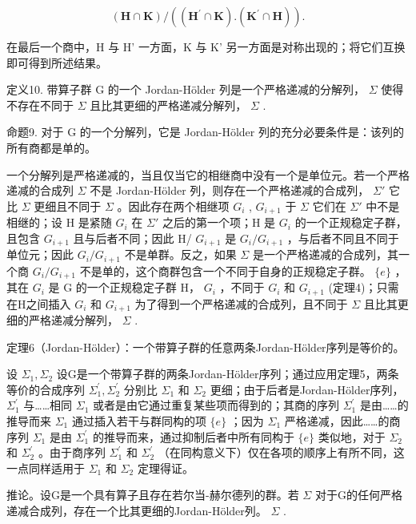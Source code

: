 \[
(\mathbf {H} \cap \mathbf {K}) / ((\mathbf {H} ^ {\prime} \cap \mathbf {K}). (\mathbf {K} ^ {\prime} \cap \mathbf {H})).
\]

在最后一个商中，H 与 H' 一方面，K 与 K' 另一方面是对称出现的；将它们互换即可得到所述结果。

定义10. 带算子群 G 的一个 Jordan-Hölder 列是一个严格递减的分解列， \(\Sigma\) 使得不存在不同于 \(\Sigma\) 且比其更细的严格递减分解列， \(\Sigma\) .

命题9. 对于 G 的一个分解列，它是 Jordan-Hölder 列的充分必要条件是：该列的所有商都是单的。

一个分解列是严格递减的，当且仅当它的相继商中没有一个是单位元。若一个严格递减的合成列 \(\Sigma\) 不是 Jordan-Hölder 列，则存在一个严格递减的合成列， \(\Sigma'\) 它比 \(\Sigma\) 更细且不同于 \(\Sigma\) 。因此存在两个相继项 \(G_i\) , \(G_{i+1}\) 于 \(\Sigma\) 它们在 \(\Sigma'\) 中不是相继的；设 H 是紧随 \(G_i\) 在 \(\Sigma'\) 之后的第一个项；H 是 \(G_i\) 的一个正规稳定子群，且包含 \(G_{i+1}\) 且与后者不同；因此 H/ \(G_{i+1}\) 是 \(G_i/G_{i+1}\) ，与后者不同且不同于单位元；因此 \(G_i/G_{i+1}\) 不是单群。反之，如果 \(\Sigma\) 是一个严格递减的合成列，其一个商 \(G_i/G_{i+1}\) 不是单的，这个商群包含一个不同于自身的正规稳定子群。 \(\{e\}\) ，其在 \(G_i\) 是 G 的一个正规稳定子群 H， \(G_i\) ，不同于 \(G_i\) 和 \(G_{i+1}\) (定理4)；只需在H之间插入 \(G_i\) 和 \(G_{i+1}\) 为了得到一个严格递减的合成列，且不同于 \(\Sigma\) 且比其更细的严格递减分解列， \(\Sigma\) .

定理6（Jordan-Hölder）：一个带算子群的任意两条Jordan-Hölder序列是等价的。

设 \(\Sigma_{1}, \Sigma_{2}\) 设G是一个带算子群的两条Jordan-Hölder序列；通过应用定理5，两条等价的合成序列 \(\Sigma_{1}^{\prime}, \Sigma_{2}^{\prime}\) 分别比 \(\Sigma_{1}\) 和 \(\Sigma_{2}\) 更细；由于后者是Jordan-Hölder序列， \(\Sigma_{1}^{\prime}\) 与……相同 \(\Sigma_{1}\) 或者是由它通过重复某些项而得到的；其商的序列 \(\Sigma_{1}^{\prime}\) 是由……的推导而来 \(\Sigma_{1}\) 通过插入若干与群同构的项 \(\{e\}\) ；因为 \(\Sigma_{1}\) 严格递减，因此……的商序列 \(\Sigma_{1}\) 是由 \(\Sigma_{1}^{\prime}\) 的推导而来，通过抑制后者中所有同构于 \(\{e\}\) 类似地，对于 \(\Sigma_{2}\) 和 \(\Sigma_{2}^{\prime}\) 。由于商序列 \(\Sigma_{1}^{\prime}\) 和 \(\Sigma_{2}^{\prime}\) （在同构意义下）仅在各项的顺序上有所不同，这一点同样适用于 \(\Sigma_{1}\) 和 \(\Sigma_{2}\) 定理得证。

推论。设G是一个具有算子且存在若尔当-赫尔德列的群。若 \(\Sigma\) 对于G的任何严格递减合成列，存在一个比其更细的Jordan-Hölder列。 \(\Sigma\) .

